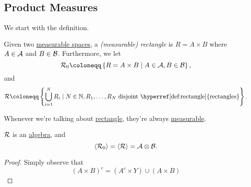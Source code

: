 \subsection{Product Measures}
We start with the definition.
\begin{definition}[Rectangle]\label{def:rectangle}
	Given two \hyperref[def:measurable-space]{measurable spaces}, a \emph{(measurable) rectangle} is \(R = A\times B\) where \(A\in \mathcal{\MakeUppercase{a}} \)
	and \(B\in \mathcal{\MakeUppercase{b}} \). Furthermore, we let
	\[
		\mathcal{\MakeUppercase{r}} _0 \coloneqq \left\{R = A\times B \mid A\in \mathcal{\MakeUppercase{a}} , B\in \mathcal{\MakeUppercase{b}} \right\},
	\]
	and
	\[
		\mathcal{\MakeUppercase{r}} \coloneqq \left\{\bigcup\limits_{i=1}^{N} R_{i} \mid N\in \mathbb{\MakeUppercase{n}} , R_1, \ldots , R_N \text{ disjoint \hyperref[def:rectangle]{rectangles}}\right\}.
	\]
\end{definition}
\begin{note}
	Whenever we're talking about \hyperref[def:rectangle]{rectangle}, they're always \hyperref[def:A-measurable-set]{measurable}.
\end{note}

\begin{lemma}
	\(\mathcal{\MakeUppercase{r}} \) is an \hyperref[def:algebra]{algebra}, and
	\[
		\left< \mathcal{\MakeUppercase{r}} _0 \right> = \left< \mathcal{\MakeUppercase{r}}  \right> = \mathcal{\MakeUppercase{a}} \otimes \mathcal{\MakeUppercase{b}}.
	\]
\end{lemma}
\begin{proof}
	Simply observe that
	\[
		(A\times B)^{c} = (A^{c} \times Y)\cup (A\times B)
	\]
\end{proof}